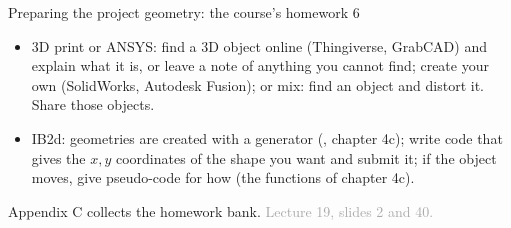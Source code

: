 \documentclass[aspectratio=169,11pt]{beamer}
\newcommand{\sourcecredit}[1]{\vfill\hfill{\tiny\textcolor{DarkGray}{#1}}}
\begin{document}
\begin{frame}{Preparing the project geometry: the course's homework 6}
\label{fr:hw6}
\small
{}
\begin{itemize}
  \item 3D print or ANSYS: find a 3D object online (Thingiverse, GrabCAD) and explain what it is, or leave a note of anything you cannot find; create your own (SolidWorks, Autodesk Fusion); or mix: find an object and distort it. Share those objects.
  \item IB2d: geometries are created with a generator (, chapter 4c); write code that gives the $x, y$ coordinates of the shape you want and submit it; if the object moves, give pseudo-code for how (the  functions of chapter 4c).
\end{itemize}
Appendix C collects the homework bank.
\sourcecredit{Lecture 19, slides 2 and 40.}
\end{frame}
\end{document}
